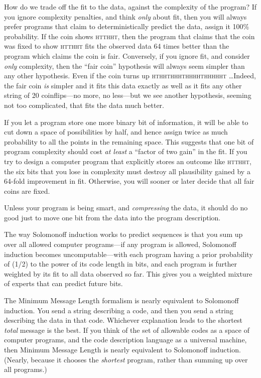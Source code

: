 {
 How do we trade off the fit to the data, against the complexity of
the program? If you ignore complexity penalties, and think
\textit{only} about fit, then you will always prefer programs that
claim to deterministically predict the data, assign it 100\%
probability. If the coin shows \textsc{htthht}, then the program that claims
that the coin was fixed to show \textsc{htthht} fits the observed data 64 times
better than the program which claims the coin is fair. Conversely, if
you ignore fit, and consider \textit{only} complexity, then the
``fair coin'' hypothesis will always
seem simpler than any other hypothesis. Even if the coin turns up
\textsc{hthhthhhthhhhthhhhht} \ldots Indeed, the fair coin \textit{is} simpler
and it fits this data exactly as well as it fits any other string of 20
coinflips---no more, no less---but we see another hypothesis, seeming
not too complicated, that fits the data much better.}

{
 If you let a program store one more binary bit of information, it
will be able to cut down a space of possibilities by half, and hence
assign twice as much probability to all the points in the remaining
space. This suggests that one bit of program complexity should cost
\textit{at least} a ``factor of two
gain'' in the fit. If you try to design a computer
program that explicitly stores an outcome like \textsc{htthht}, the six bits
that you lose in complexity must destroy all plausibility gained by a
64-fold improvement in fit. Otherwise, you will sooner or later decide
that all fair coins are fixed.}

{
 Unless your program is being smart, and \textit{compressing} the
data, it should do no good just to move one bit from the data into the
program description.}

{
 The way Solomonoff induction works to predict sequences is that
you sum up over all allowed computer programs---if any program is
allowed, Solomonoff induction becomes uncomputable---with each program
having a prior probability of (1/2) to the power of its code length in
bits, and each program is further weighted by its fit to all data
observed so far. This gives you a weighted mixture of experts that can
predict future bits.}

{
 The Minimum Message Length formalism is nearly equivalent to
Solomonoff induction. You send a string describing a code, and then you
send a string describing the data in that code. Whichever explanation
leads to the shortest \textit{total} message is the best. If you think
of the set of allowable codes as a space of computer programs, and the
code description language as a universal machine, then Minimum Message
Length is nearly equivalent to Solomonoff induction. (Nearly, because
it chooses the \textit{shortest} program, rather than summing up over
all programs.)}


